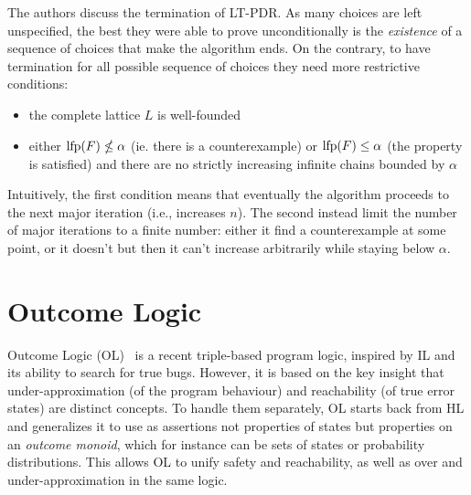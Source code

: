 The authors discuss the termination of LT-PDR. As many choices are left unspecified, the best they were able to prove unconditionally is the \emph{existence} of a sequence of choices that make the algorithm ends. On the contrary, to have termination for all possible sequence of choices they need more restrictive conditions:
\begin{itemize}
	\item the complete lattice $L$ is well-founded
	\item either $\text{lfp}(F) \nleq \alpha$ (ie. there is a counterexample) or $\text{lfp}(F) \le \alpha$ (the property is satisfied) and there are no strictly increasing infinite chains bounded by $\alpha$
\end{itemize}
Intuitively, the first condition means that eventually the algorithm proceeds to the next major iteration (i.e., increases $n$). The second instead limit the number of major iterations to a finite number: either it find a counterexample at some point, or it doesn't but then it can't increase arbitrarily while staying below $\alpha$.

\section{Outcome Logic}\label{sec:sota:ol}
Outcome Logic (OL)~\cite{ZDS23} is a recent triple-based program logic, inspired by IL and its ability to search for true bugs. However, it is based on the key insight that under-approximation (of the program behaviour) and reachability (of true error states) are distinct concepts. To handle them separately, OL starts back from HL and generalizes it to use as assertions not properties of states but properties on an \emph{outcome monoid}, which for instance can be sets of states or probability distributions. This allows OL to unify safety and reachability, as well as over and under-approximation in the same logic.

